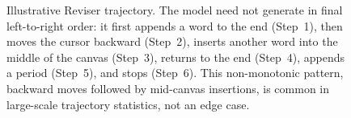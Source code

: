 \documentclass[11pt]{article}
\begin{document}
\begin{figure}[t]
{
}%
\caption{Illustrative Reviser trajectory. The model need not generate in final left-to-right order: it first appends a word to the end (Step~1), then moves the cursor backward (Step~2), inserts another word into the middle of the canvas (Step~3), returns to the end (Step~4), appends a period (Step~5), and stops (Step~6). This non-monotonic pattern, backward moves followed by mid-canvas insertions, is common in large-scale trajectory statistics, not an edge case.}
\label{fig:trajectory_example}
\end{figure}
\end{document}
